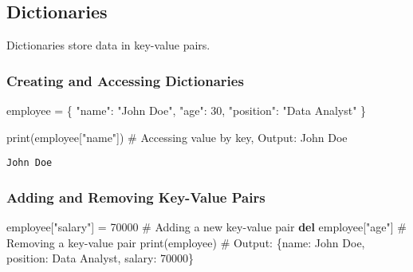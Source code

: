 \documentclass[
  letterpaper,
  DIV=11,
  numbers=noendperiod]{scrreprt}
\newenvironment{Shaded}{\begin{snugshade}}{\end{snugshade}}
\newcommand{\BuiltInTok}[1]{\textcolor[rgb]{0.00,0.23,0.31}{#1}}
\newcommand{\CommentTok}[1]{\textcolor[rgb]{0.37,0.37,0.37}{#1}}
\newcommand{\DecValTok}[1]{\textcolor[rgb]{0.68,0.00,0.00}{#1}}
\newcommand{\KeywordTok}[1]{\textcolor[rgb]{0.00,0.23,0.31}{\textbf{#1}}}
\newcommand{\NormalTok}[1]{\textcolor[rgb]{0.00,0.23,0.31}{#1}}
\newcommand{\OperatorTok}[1]{\textcolor[rgb]{0.37,0.37,0.37}{#1}}
\newcommand{\StringTok}[1]{\textcolor[rgb]{0.13,0.47,0.30}{#1}}
\begin{document}
\subsection{Dictionaries}\label{dictionaries}

Dictionaries store data in key-value pairs.

\subsubsection{Creating and Accessing
Dictionaries}\label{creating-and-accessing-dictionaries}

\begin{Shaded}
\begin{Highlighting}[]
\NormalTok{employee }\OperatorTok{=}\NormalTok{ \{}
    \StringTok{"name"}\NormalTok{: }\StringTok{"John Doe"}\NormalTok{,}
    \StringTok{"age"}\NormalTok{: }\DecValTok{30}\NormalTok{,}
    \StringTok{"position"}\NormalTok{: }\StringTok{"Data Analyst"}
\NormalTok{\}}

\BuiltInTok{print}\NormalTok{(employee[}\StringTok{"name"}\NormalTok{])  }\CommentTok{\# Accessing value by key, Output: John Doe}
\end{Highlighting}
\end{Shaded}

\begin{verbatim}
John Doe
\end{verbatim}

\subsubsection{Adding and Removing Key-Value
Pairs}\label{adding-and-removing-key-value-pairs}

\begin{Shaded}
\begin{Highlighting}[]
\NormalTok{employee[}\StringTok{"salary"}\NormalTok{] }\OperatorTok{=} \DecValTok{70000}  \CommentTok{\# Adding a new key{-}value pair}
\KeywordTok{del}\NormalTok{ employee[}\StringTok{"age"}\NormalTok{]         }\CommentTok{\# Removing a key{-}value pair}
\BuiltInTok{print}\NormalTok{(employee)  }\CommentTok{\# Output: \{\textquotesingle{}name\textquotesingle{}: \textquotesingle{}John Doe\textquotesingle{}, \textquotesingle{}position\textquotesingle{}: \textquotesingle{}Data Analyst\textquotesingle{}, \textquotesingle{}salary\textquotesingle{}: 70000\}}
\end{Highlighting}
\end{Shaded}
\end{document}
